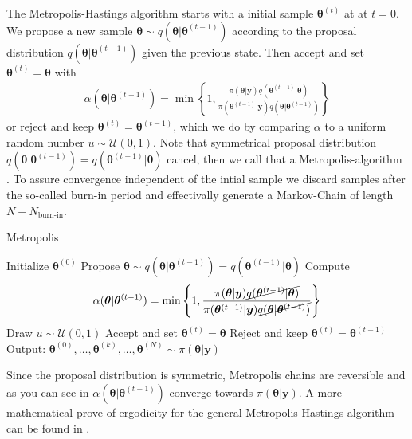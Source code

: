 The Metropolis-Hastings algorithm starts with a initial sample $\bm{\theta}^{(t)}$ at  at $t=0$.
We propose a new sample $\bm{\theta}\sim q(\bm{\theta} | \bm{\theta}^{(t-1)})$ according to the proposal distribution $q(\bm{\theta} | \bm{\theta}^{(t-1)})$ given the previous state.
Then accept and set $ \bm{\theta}^{(t)} = \bm{\theta}$ with
\begin{align}
\alpha(\bm{\theta} | \bm{\theta}^{(t-1)}) = \min \left\{ 1, \frac{\pi(\bm{\theta}  | \bm{y}) q(\bm{\theta}^{(t-1)} | \bm{\theta})  }{\pi(\bm{\theta}^{(t-1)}| \bm{y}) q(\bm{\theta} | \bm{\theta}^{(t-1)}) } \right\}
\end{align}
or reject and keep $\bm{\theta}^{(t)} = \bm{\theta}^{(t-1)}$, which we do by comparing $\alpha$ to a uniform random number $u \sim \mathcal{U}(0,1)$.
Note that symmetrical proposal distribution $q(\bm{\theta} | \bm{\theta}^{(t-1)}) = q(\bm{\theta}^{(t-1)} | \bm{\theta}) $ cancel, then we call that a Metropolis-algorithm \cite{}.
To assure convergence independent of the intial sample we discard samples after the so-called burn-in period and effectivally generate a Markov-Chain of length $N - N_{\text{burn-in}}$.

\begin{algorithm}
	\caption{Metropolis}
	\begin{algorithmic}[1]
		\STATE Initialize \( \bm{\theta}^{(0)} \)
		\STATE Propose \( \bm{\theta} \sim q(\bm{\theta} | \bm{\theta}^{(t-1)}) = q(\bm{\theta}^{(t-1)} | \bm{\theta}) \)
		\STATE Compute
			\[ \alpha(\bm{\theta} | \bm{\theta}^{(t-1)}) = \min \left\{ 1, \frac{\pi(\bm{\theta}  | \bm{y}) \cancel{q(\bm{\theta}^{(t-1)} | \bm{\theta}) } }{\pi(\bm{\theta}^{(t-1)}| \bm{y}) \cancel{q(\bm{\theta} | \bm{\theta}^{(t-1)})} } \right\} \]
		\STATE Draw $u \sim \mathcal{U}(0,1)$
		\STATE Accept and set \( \bm{\theta}^{(t)} = \bm{\theta} \)
		\ELSE  
		\STATE Reject and keep \(\bm{\theta}^{(t)} = \bm{\theta}^{(t-1)} \)
		\ENDIF
		\ENDFOR
		\STATE Output: $ \bm{\theta}^{(0)}, \dots,  \bm{\theta}^{(k)} , \dots,   \bm{\theta}^{(N)} \sim \pi(\bm{\theta}| \bm{y}) $
	\end{algorithmic}
\end{algorithm}


Since the proposal distribution is symmetric, Metropolis chains are reversible and as you can see in $\alpha(\bm{\theta} | \bm{\theta}^{(t-1)})$ converge towards $\pi(\bm{\theta}| \bm{y})$.
A more mathematical prove of ergodicity for the general Metropolis-Hastings algorithm can be found in \cite{}.


